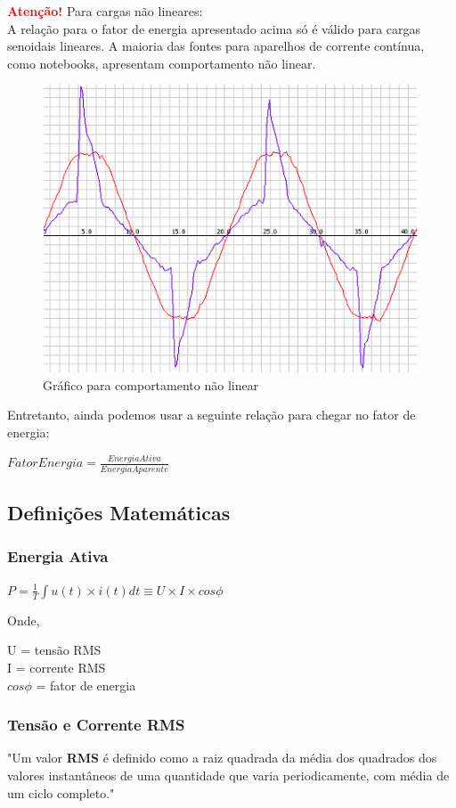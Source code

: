 \documentclass[a4paper, 12pt]{article}
\begin{document}
\textbf{\textcolor{red}{Atenção!}} Para cargas não lineares:\\
A relação para o fator de energia apresentado acima só é válido para cargas senoidais lineares. A maioria das fontes para aparelhos de corrente contínua, como notebooks, apresentam comportamento não linear.
\begin{figure}[h]
	\centering
	\includegraphics[width=0.7\linewidth]{imagens/graf2}
	\caption{Gráfico para comportamento não linear}
	\label{fig:graf2}
\end{figure}

Entretanto, ainda podemos usar a seguinte relação para chegar no fator de energia:
\begin{center}
	$
	FatorEnergia = \frac{EnergiaAtiva}{EnergiaAparente}
	$
\end{center}

\subsection{Definições Matemáticas}
\subsubsection{Energia Ativa}
\begin{center}
	$
	P = \frac{1}{T}\int u(t)\times i(t)dt \equiv U\times I\times cos\phi
	$
\end{center}
Onde,

U = tensão RMS\\
I = corrente RMS\\
$cos \phi$ = fator de energia

\subsubsection{Tensão e Corrente RMS}
"Um valor \textbf{RMS} é definido como a raiz quadrada da média dos quadrados dos valores instantâneos de uma quantidade que varia periodicamente, com média de um ciclo completo."\\
\end{document}
